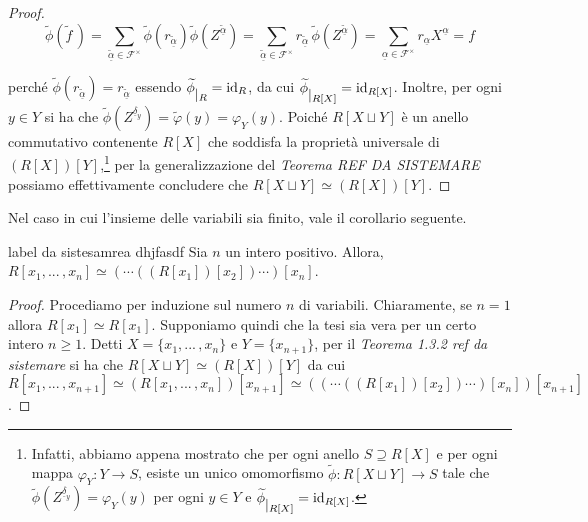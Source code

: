 \begin{proof}
  \[ \widetilde{\phi}(\widetilde{f}\,) = \sum\limits_{\widetilde{\underline{\alpha}}
  \in \mathcal{F}^{\times}} \widetilde{\phi}(r_{\widetilde{\underline{\alpha}}}) \widetilde{\phi}(Z^{\widetilde{\underline{\alpha}}}) 
  = \sum\limits_{\widetilde{\underline{\alpha}}\in \mathcal{F}^{\times}} r_{\widetilde{\underline{\alpha}}}\,\widetilde{\phi}(Z^{\widetilde{\underline{\alpha}}}) 
  = \sum\limits_{\underline{\alpha}\in \mathcal{F}^{\times}} r_{\underline{\alpha}} X^{\underline{\alpha}} = f \] 
  
  \noindent perché $\widetilde{\phi}(r_{\widetilde{\underline{\alpha}}})=r_{\widetilde{\underline{\alpha}}}$ essendo 
  $\widetilde{\phi} \raisebox{-.5em}{$\vert_{R}$}= \operatorname{id}_R$, da cui $\widetilde{\phi} \raisebox{-.5em}{$\vert_{R[X]}$}=\operatorname{id}_{R[X]}$. 
  Inoltre, per ogni $y\in Y$ si ha che $\widetilde{\phi}(Z^{\underline{\delta}_y})=\widetilde{\varphi}(y)=\varphi_Y(y)$. 
  Poiché $R[X\sqcup Y]$ è un anello commutativo contenente $R[X]$ che soddisfa la proprietà universale di $(R[X])[Y]$,\footnote{Infatti, 
  abbiamo appena mostrato che per ogni anello $S\supseteq R[X]$ e per ogni mappa $\varphi_Y\colon Y\to S$, esiste un unico omomorfismo 
  $\widetilde{\phi}\colon R[X\sqcup Y]\to S$ tale che $\widetilde{\phi}(Z^{\underline{\delta}_y})=\varphi_Y(y)$ 
  per ogni $y\in Y$ e $\widetilde{\phi} \raisebox{-.5em}{$\vert_{R[X]}$}=\operatorname{id}_{R[X]}$.} per la generalizzazione del 
  \emph{Teorema REF DA SISTEMARE} possiamo effettivamente concludere che $R[X \sqcup Y]\simeq (R[X])[Y]$.
\end{proof}

\noindent Nel caso in cui l'insieme delle variabili sia finito, vale il corollario seguente.

\begin{cor}[]{label da sistesamrea dhjfasdf}
  Sia $n$ un intero positivo. Allora, $R[x_1,...\,,x_n]\simeq (\cdots((R[x_1])[x_2])\cdots )[x_n]$.
\end{cor}
\vspace{-4mm}
\begin{proof}
  Procediamo per induzione sul numero $n$ di variabili. Chiaramente, se $n=1$ allora $R[x_1]\simeq R[x_1]$. 
  Supponiamo quindi che la tesi sia vera per un certo intero $n\geq 1.$ Detti $X=\{x_1,...\,,x_n\}$ e $Y=\{x_{n+1}\}$, 
  per il \emph{Teorema 1.3.2 ref da sistemare} si ha che $R[X\sqcup Y]\simeq (R[X])[Y]$ da cui $R[x_1,...\,,x_{n+1}]\simeq 
  (R[x_1,...\,,x_n])[x_{n+1}]\simeq ((\cdots((R[x_1])[x_2])\cdots )[x_n])[x_{n+1}]$.
\end{proof}

